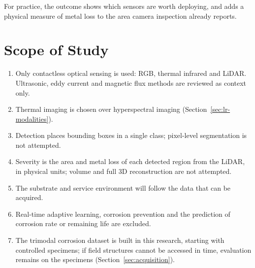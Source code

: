 For practice, the outcome shows which sensors are worth deploying, and adds a
physical measure of metal loss to the area camera inspection already reports.

\section{Scope of Study}
\label{sec:scope}

\begin{enumerate}[label=\arabic*),leftmargin=*,itemsep=5pt]
  \item Only contactless optical sensing is used: RGB, thermal infrared and
        LiDAR. Ultrasonic, eddy current and magnetic flux methods are reviewed
        as context only.
  \item Thermal imaging is chosen over hyperspectral imaging
        (Section~\ref{sec:lr-modalities}).
  \item Detection places bounding boxes in a single class; pixel-level
        segmentation is not attempted.
  \item Severity is the area and metal loss of each detected region from the
        LiDAR, in physical units; volume and full 3D reconstruction are not
        attempted.
  \item The substrate and service environment will follow the data that can be
        acquired.
  \item Real-time adaptive learning, corrosion prevention and the prediction of
        corrosion rate or remaining life are excluded.
  \item The trimodal corrosion dataset is built in this research, starting with
        controlled specimens; if field structures cannot be accessed in time,
        evaluation remains on the specimens (Section~\ref{sec:acquisition}).
\end{enumerate}
